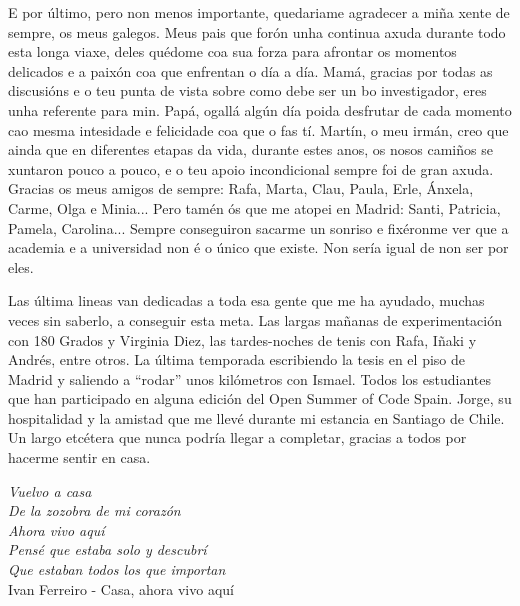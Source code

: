 \begin{acknowledgementslong}
E por último, pero non menos importante, quedariame agradecer a miña xente de sempre, os meus galegos. Meus pais que forón unha continua axuda durante todo esta longa viaxe, deles quédome coa sua forza para afrontar os momentos delicados e a paixón coa que enfrentan o día a día. Mamá, gracias por todas as discusións e o teu punta de vista sobre como debe ser un bo investigador, eres unha referente para min. Papá, ogallá algún día poida desfrutar de cada momento cao mesma intesidade e felicidade coa que o fas tí. Martín, o meu irmán, creo que ainda que en diferentes etapas da vida, durante estes anos, os nosos camiños se xuntaron pouco a pouco, e o teu apoio incondicional sempre foi de gran axuda. Gracias os meus amigos de sempre: Rafa, Marta, Clau, Paula, Erle, Ánxela, Carme, Olga e Minia... Pero tamén ós que me atopei en Madrid: Santi, Patricia, Pamela, Carolina... Sempre conseguiron sacarme un sonriso e fixéronme ver que a academia e a universidad non é o único que existe. Non sería igual de non ser por eles.

Las última lineas van dedicadas a toda esa gente que me ha ayudado, muchas veces sin saberlo, a conseguir esta meta. Las largas mañanas de experimentación con 180 Grados y Virginia Diez, las tardes-noches de tenis con Rafa, Iñaki y Andrés, entre otros. La última temporada escribiendo la tesis en el piso de Madrid y saliendo a ``rodar'' unos kilómetros con Ismael. Todos los estudiantes que han participado en alguna edición del Open Summer of Code Spain. Jorge, su hospitalidad y la amistad que me llevé durante mi estancia en Santiago de Chile. Un largo etcétera que nunca podría llegar a completar, gracias a todos por hacerme sentir en casa.

\vspace{10mm}

\textit{
\null\hfill Vuelvo a casa \\
\null\hfill De la zozobra de mi corazón \\
\null\hfill Ahora vivo aquí \\
\null\hfill Pensé que estaba solo y descubrí \\
\null\hfill Que estaban todos los que importan \vspace{6mm} \\
} 
\null\hfill Ivan Ferreiro - Casa, ahora vivo aquí

\end{acknowledgementslong}




